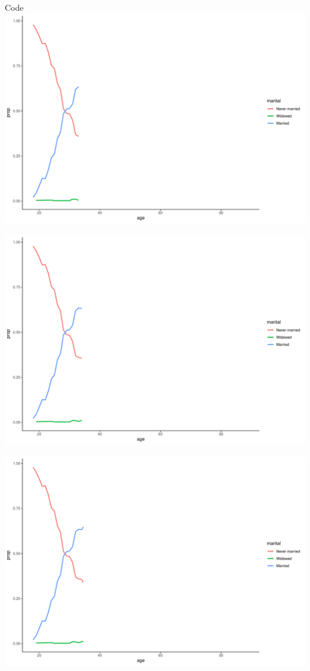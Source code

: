 \documentclass[
  ignorenonframetext,
]{beamer}
\begin{document}
\begin{frame}[fragile]{Code}
\includegraphics{gss_cat_files/figure-beamer/unnamed-chunk-1-26.pdf}

\includegraphics{gss_cat_files/figure-beamer/unnamed-chunk-1-27.pdf}

\includegraphics{gss_cat_files/figure-beamer/unnamed-chunk-1-28.pdf}


\end{frame}
\end{document}
